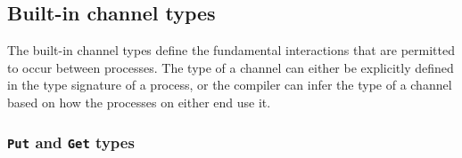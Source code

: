 \documentclass[11pt]{article}
\begin{document}
%
%


\subsection{Built-in channel types}
\label{Sec:channeltypes}


The built-in channel types define the fundamental interactions that are permitted to occur between processes.
The type of a channel can either be explicitly defined in the type signature of a process, or the compiler can infer the type of a channel based on how the processes on either end use it.

\subsubsection{\lstinline$Put$ and \lstinline$Get$ types}
\end{document}
